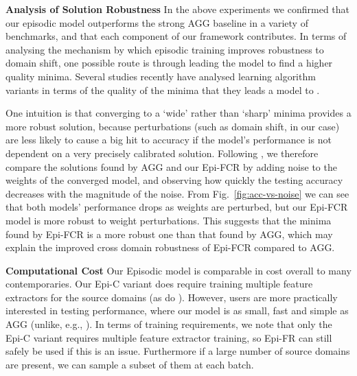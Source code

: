 \documentclass[10pt,twocolumn,letterpaper]{article}
\newcommand{\keypoint}[1]{\vspace{0.1cm}\noindent\textbf{#1}\quad}
\begin{document}
\keypoint{Analysis of Solution Robustness} In the above experiments we confirmed that our episodic model outperforms the strong AGG baseline in a variety of benchmarks, and that each component of our framework contributes. In terms of analysing the mechanism by which episodic training improves robustness to domain shift, one possible route is through leading the model to find a higher quality minima. Several studies recently have analysed learning algorithm variants in terms of the quality of the minima that they leads a model to \cite{Keskar2017sharpminima,chaudhar2017entropySGD}. 

One intuition is that converging to a `wide' rather than `sharp' minima provides a more robust solution, because perturbations (such as domain shift, in our case) are less likely to cause a big hit to accuracy if the model's performance is not dependent on a very precisely calibrated solution. Following \cite{Keskar2017sharpminima,Zhang2018dml}, we therefore compare the solutions found by AGG and our Epi-FCR by adding noise to the weights of the converged model, and observing how quickly the testing accuracy decreases with the magnitude of the noise. From  Fig.~\ref{fig:acc-vs-noise} we can see that both models' performance drops as weights are perturbed, but our Epi-FCR model is more robust to weight perturbations. This suggests that the minima found by Epi-FCR is a more robust one than that found by AGG, which may explain the improved cross domain robustness of Epi-FCR compared to AGG.

\keypoint{Computational Cost} Our Episodic model is comparable in cost overall to many contemporaries. Our Epi-C variant does require training multiple feature extractors for the source domains (as do \cite{Khosla12undobias,Xu2014lre,Li2017dg,Massimiliano2018ICIP}). However, users are more practically interested in testing performance, where our model is as small, fast and simple as AGG (unlike, e.g., \cite{Xu2014lre,Massimiliano2018ICIP}). In terms of training requirements, we note that only the Epi-C variant requires multiple feature extractor training, so Epi-FR can still safely be used if this is an issue. Furthermore if a large number of source domains are present, we can sample a subset of them at each batch. 
\end{document}
